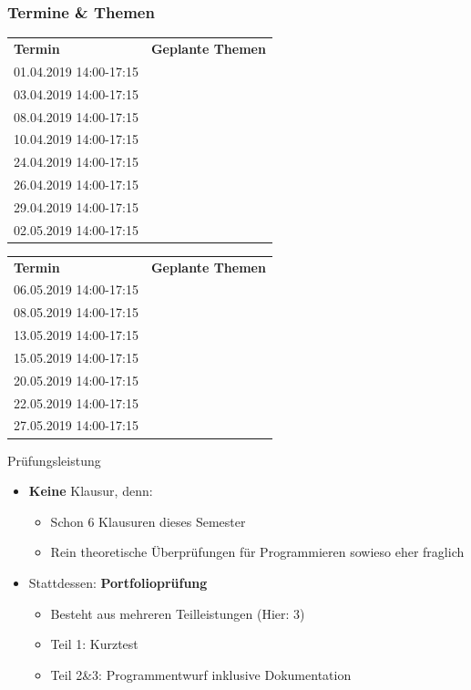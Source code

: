 \begin{frame}[allowframebreaks]
	\frametitle{Termine \& Themen}
	
	\vfill
	\begin{tabularx}{\textwidth}{ll}
		\textbf{Termin} & \textbf{Geplante Themen}\\
		01.04.2019 14:00-17:15 & \\
		03.04.2019 14:00-17:15 & \\
		08.04.2019 14:00-17:15 & \\
		10.04.2019 14:00-17:15 & \\
		24.04.2019 14:00-17:15 & \\
		26.04.2019 14:00-17:15 & \\
		29.04.2019 14:00-17:15 & \\
		02.05.2019 14:00-17:15 & \\
	\end{tabularx}
	\vfill
	
	\framebreak
	
	\vfill
	\begin{tabularx}{\textwidth}{ll}
		\textbf{Termin} & \textbf{Geplante Themen}\\
		06.05.2019 14:00-17:15 & \\
		08.05.2019 14:00-17:15 & \\
		13.05.2019 14:00-17:15 & \\
		15.05.2019 14:00-17:15 & \\
		20.05.2019 14:00-17:15 & \\
		22.05.2019 14:00-17:15 & \\
		27.05.2019 14:00-17:15 & \\	
	\end{tabularx}
	\vfill
	
\end{frame}

\begin{frame}{Prüfungsleistung}{}
	\begin{itemize}
	\item \textbf{Keine} Klausur, denn:
		\begin{itemize}
			\item Schon 6 Klausuren dieses Semester
			\item Rein theoretische Überprüfungen für Programmieren sowieso eher fraglich
		\end{itemize}
	\item Stattdessen: \textbf{Portfolioprüfung}
		\begin{itemize}
			\item Besteht aus mehreren Teilleistungen (Hier: 3)
			\item Teil 1: Kurztest
			\item Teil 2\&3: Programmentwurf inklusive Dokumentation 
		\end{itemize}
	\end{itemize}
\end{frame}

